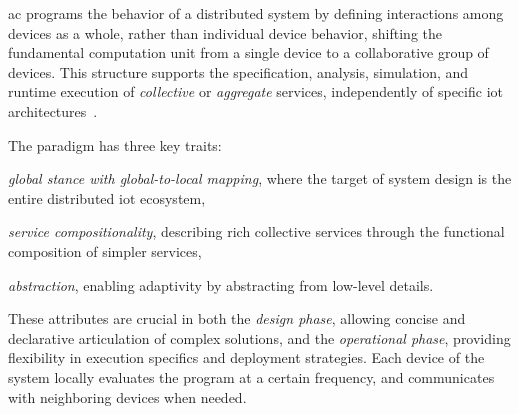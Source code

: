\documentclass[12pt, a4paper]{article}
\newenvironment{inlinelist}{\begin{enumerate*}[label=\emph{(\roman*)}]}{\end{enumerate*}}
\begin{document}
\ac{ac} programs the behavior of a distributed system by defining interactions among devices as a whole,
rather than individual device behavior,
shifting the fundamental computation unit from a single device to a collaborative group of devices.
%
This structure supports the specification, analysis, simulation,
and runtime execution of \emph{collective} or \emph{aggregate} services,
independently of specific \ac{iot} architectures~\cite{FI2020-pulverization}.

The paradigm has three key traits:
\begin{inlinelist}
    \item \emph{global stance with global-to-local mapping}, where the target of system design is the entire distributed \ac{iot} ecosystem,
    \item \emph{service compositionality}, describing rich collective services through the functional composition of simpler services,
    \item \emph{abstraction}, enabling adaptivity by abstracting from low-level details.
\end{inlinelist}
%
These attributes are crucial in both the \emph{design phase},
allowing concise and declarative articulation of complex solutions,
and the \emph{operational phase},
providing flexibility in execution specifics and deployment strategies.
%
Each device of the system locally evaluates the program at a certain frequency,
and communicates with neighboring devices when needed.
\end{document}
